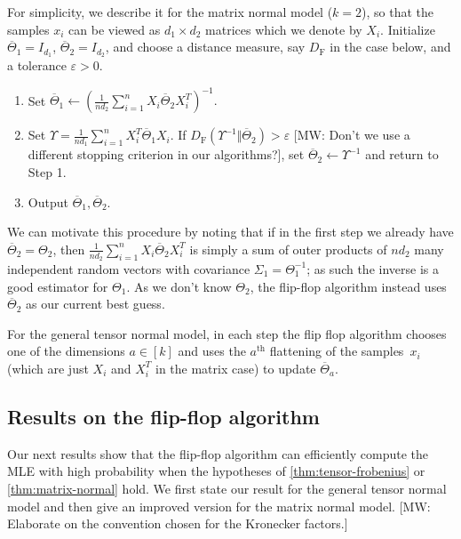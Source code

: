 \documentclass[aos]{imsart}
\theoremstyle{definition}
\numberwithin{equation}{section}
\newcommand{\eps}{\varepsilon}
\newcommand{\samp}{x}
\newcommand{\DF}{D_{\operatorname{F}}}
\newcommand{\MW}[1]{{\color{red}[MW: #1]}}
\newcommand{\MW}[1]{{}}
\begin{document}
For simplicity, we describe it for the matrix normal model ($k=2$), so that the samples $\samp_i$ can be viewed as $d_1\times d_2$ matrices which we denote by $X_i$.
Initialize $\overline{\Theta}_1 = I_{d_1}$, $\overline{\Theta}_2 = I_{d_2}$, and choose a distance measure, say $\DF$ in the case below, and a tolerance $\eps > 0$.
\begin{enumerate}
\item Set $\overline{\Theta}_1 \leftarrow (\frac{1}{n d_2} \sum_{i = 1}^n X_i \overline{\Theta}_2 X_i^T)^{-1}.$
\item\label{it:sinkhorn second} Set $\Upsilon = \frac{1}{n d_1} \sum_{i = 1}^n X_i^T \overline{\Theta}_1 X_i$.
If $\DF( \Upsilon^{-1}\Vert  \overline{\Theta}_2) > \eps$ \MW{Don't we use a different stopping criterion in our algorithms?}, set $\overline{\Theta}_2 \leftarrow \Upsilon^{-1}$ and return to Step 1.
\item Output $\overline{\Theta}_1, \overline{\Theta}_2$.
\end{enumerate}

We can motivate this procedure by noting that if in the first step we already have $\overline{\Theta}_2 = \Theta_2$, then $\frac{1}{n d_2} \sum_{i = 1}^n X_i \overline{\Theta}_2 X_i^T$ is simply a sum of outer products of $nd_2$ many independent random vectors with covariance $\Sigma_1 = \Theta_1^{-1}$; as such the inverse is a good estimator for $\Theta_1$.
As we don't know $\Theta_2$, the flip-flop algorithm instead uses $\overline{\Theta}_2$ as our current best guess.

For the general tensor normal model, in each step the flip flop algorithm chooses one of the dimensions $a \in [k]$ and uses the $a^\text{th}$ flattening of the samples~$x_i$ (which are just $X_i$ and $X_i^T$ in the matrix case) to update $\overline{\Theta}_a$.

\subsection{Results on the flip-flop algorithm}
Our next results show that the flip-flop algorithm can efficiently compute the MLE with high probability when the hypotheses of \cref{thm:tensor-frobenius} or \cref{thm:matrix-normal} hold. We first state our result for the general tensor normal model and then give an improved version for the matrix normal model.
\MW{Elaborate on the convention chosen for the Kronecker factors.}
\end{document}
